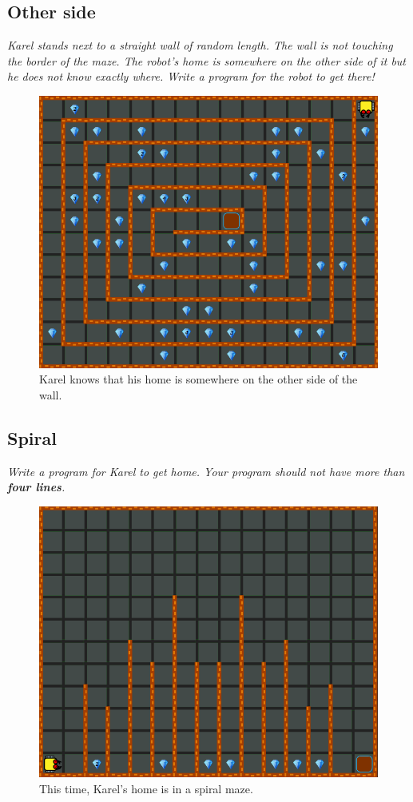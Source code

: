 \subsection{Other side}

{\em Karel stands next to a straight wall of random length. The wall is not touching the border of the maze. The robot's home is somewhere on the other side of it but he does not know exactly where. Write a program for the robot to get there!}\\[-7mm]

\begin{figure}[!ht]
\begin{center}
\includegraphics[height=0.4\textwidth]{img/e03.png}
\end{center}
\vspace{-4mm}
\caption{Karel knows that his home is somewhere on the other side of the wall.}
\label{fig:e03}
\vspace{-10mm}
\end{figure}
\newpage

\subsection{Spiral}

{\em Write a program for Karel to get home. Your program should not have more than {\bf four lines}.}

\begin{figure}[!ht]
\begin{center}
\includegraphics[height=0.4\textwidth]{img/e04.png}
\end{center}
\vspace{-4mm}
\caption{This time, Karel's home is in a spiral maze.}
\label{fig:e04}
\vspace{-10mm}
\end{figure}



